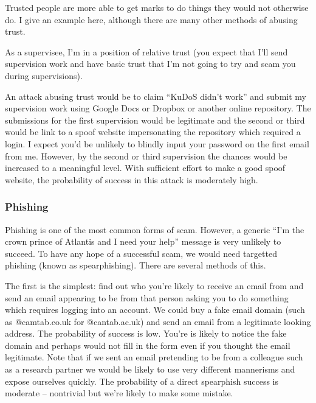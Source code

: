 \documentclass[10pt,\jkfside,a4paper]{article}
\begin{document}
\begin{enumerate}
Trusted people are more able to get marks to do things they would not otherwise do. I give an example 
here, although there are many other methods of abusing trust.

As a supervisee, I'm in a position of relative trust (you expect that I'll send supervision work and have basic 
trust that I'm not going to try and scam you during supervisions).

An attack abusing trust would be to claim ``KuDoS didn't work'' and submit my 
supervision work using Google Docs or Dropbox or another online repository. The submissions for the 
first supervision would be legitimate and the second or third would be link to a spoof website 
impersonating the repository which required a login. I expect you'd be unlikely to blindly input your 
password on the first email from me. However, by the second or third supervision the chances would be 
increased to a meaningful level. With sufficient effort to make a good spoof website, the probability 
of success in this attack is moderately high.

\subsubsection*{Phishing}

Phishing is one of the most common forms of scam. However, a 
generic ``I'm the crown prince of Atlantis and I need your help'' message is very unlikely to succeed. 
To have any hope of a successful scam, we would need targetted phishing (known as spearphishing). 
There are several methods of this. 

The first is the simplest: find out who you're likely to receive an email from and send an email appearing 
to be from that person asking you to do something which requires logging into an account. We could buy 
a fake email domain (such as @camtab.co.uk for @cantab.ac.uk) and send an 
email from a legitimate looking address. The probability of success is low. 
You're is likely to notice the fake domain and perhaps would not fill in the form even if you thought 
the email legitimate. Note that if we sent an email pretending to be from a colleague such as a 
research partner we would be likely to use very different mannerisms and expose ourselves quickly. 
The probability of a direct spearphish success is moderate -- nontrivial but we're likely to make 
some mistake.


\end{enumerate}
\end{document}
